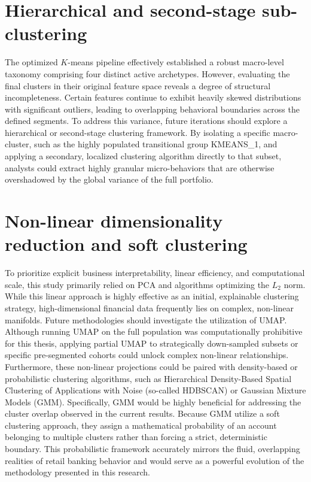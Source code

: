\section{Hierarchical and second-stage sub-clustering}
The optimized $K$-means pipeline effectively established a robust macro-level taxonomy comprising four distinct active archetypes.
However, evaluating the final clusters in their original feature space reveals a degree of structural incompleteness.
Certain features continue to exhibit heavily skewed distributions with significant outliers, leading to overlapping behavioral boundaries across the defined segments.
To address this variance, future iterations should explore a hierarchical or second-stage clustering framework.
By isolating a specific macro-cluster, such as the highly populated transitional group KMEANS\_1, and applying a secondary, localized clustering algorithm directly to that subset, analysts could extract highly granular micro-behaviors that are otherwise overshadowed by the global variance of the full portfolio.

\section{Non-linear dimensionality reduction and soft clustering}
To prioritize explicit business interpretability, linear efficiency, and computational scale, this study primarily relied on PCA and algorithms optimizing the $L_2$ norm.
While this linear approach is highly effective as an initial, explainable clustering strategy, high-dimensional financial data frequently lies on complex, non-linear manifolds.
Future methodologies should investigate the utilization of UMAP.
Although running UMAP on the full population was computationally prohibitive for this thesis, applying partial UMAP to strategically down-sampled subsets or specific pre-segmented cohorts could unlock complex non-linear relationships.
Furthermore, these non-linear projections could be paired with density-based or probabilistic clustering algorithms, such as Hierarchical Density-Based Spatial Clustering of Applications with Noise (so-called HDBSCAN) or Gaussian Mixture Models (GMM).
Specifically, GMM would be highly beneficial for addressing the cluster overlap observed in the current results.
Because GMM utilize a soft clustering approach, they assign a mathematical probability of an account belonging to multiple clusters rather than forcing a strict, deterministic boundary.
This probabilistic framework accurately mirrors the fluid, overlapping realities of retail banking behavior and would serve as a powerful evolution of the methodology presented in this research.

